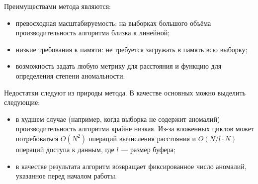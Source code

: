 Преимуществами метода являются:
\begin{itemize}
	\item превосходная масштабируемость: на выборках большого объёма производительность алгоритма близка к линейной;
	\item низкие требования к памяти: не требуется загружать в память всю выборку;
	\item возможность задать любую метрику для расстояния и функцию для определения степени аномальности.
\end{itemize}

Недостатки следуют из природы метода. В качестве основных можно выделить следующие:
\begin{itemize}
	\item в худшем случае (например, когда выборка не содержит аномалий) производительность алгоритма крайне низкая. Из-за вложенных циклов может потребоваться $O(N^2)$ операций вычисления расстояния и $O(N/l \cdot N)$ операций доступа к данным, где $l$ --- размер буфера;
	\item в качестве результата алгоритм возвращает фиксированное число аномалий, указанное перед началом работы.
\end{itemize}